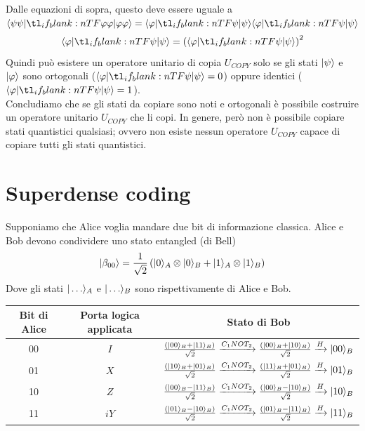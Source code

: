 \documentclass[12pt, a4paper]{report}
\begin{document}
Dalle equazioni di sopra, questo deve essere uguale a $\braket{\psi\psi}{\varphi\varphi} = \braket{\varphi}{\psi}\braket{\varphi}{\psi}$
\begin{equation*}
    \braket{\varphi}{\psi} = \left(\braket{\varphi}{\psi}\right)^{2}
\end{equation*}
Quindi può esistere un operatore unitario di copia $U_{COPY}$ solo se gli stati $| \psi \rangle$ e $| \varphi \rangle$ sono ortogonali ($\braket{\varphi}{\psi} = 0$) oppure identici ($\braket{\varphi}{\psi} = 1$).\\
Concludiamo che se gli stati da copiare sono noti e ortogonali è possibile costruire un operatore unitario $U_{COPY}$ che li copi. In genere, però non è possibile copiare stati quantistici qualsiasi; ovvero non esiste nessun operatore $U_{COPY}$ capace di copiare tutti gli stati quantistici. 
\section{Superdense coding}
Supponiamo che Alice voglia mandare due bit di informazione classica. Alice e Bob devono condividere uno stato entangled (di Bell)
\begin{equation*}
    | \beta_{00} \rangle = \frac{1}{\sqrt{2}}\left(| 0 \rangle_{A}\otimes| 0 \rangle_{B}+| 1 \rangle_{A}\otimes| 1 \rangle_{B}\right)
\end{equation*}
Dove gli stati $| \ldots \rangle_{A}$ e $| \ldots \rangle_{B}$ sono rispettivamente di Alice e Bob.
\begin{center}
    \begin{tabular}{| c | c | c |}
        \hline
        \textbf{Bit di Alice} & \textbf{Porta logica applicata} & \textbf{Stato di Bob} \\
        \hline
        00 & $I$ & $\frac{\left(| 00 \rangle_{B}+| 11 \rangle_{B}\right)}{\sqrt{2}} \xrightarrow{C_{1}NOT_{2}} \frac{\left(| 00 \rangle_{B}+| 10 \rangle_{B}\right)}{\sqrt{2}} \xrightarrow{H} | 00 \rangle_{B}$ \\
        \hline
        01 & $X$ & $\frac{\left(| 10 \rangle_{B}+| 01 \rangle_{B}\right)}{\sqrt{2}} \xrightarrow{C_{1}NOT_{2}} \frac{\left(| 11 \rangle_{B}+| 01 \rangle_{B}\right)}{\sqrt{2}} \xrightarrow{H} | 01 \rangle_{B}$ \\
        \hline
        10 & $Z$ & $\frac{\left(| 00 \rangle_{B}-| 11 \rangle_{B}\right)}{\sqrt{2}} \xrightarrow{C_{1}NOT_{2}} \frac{\left(| 00 \rangle_{B}-| 10 \rangle_{B}\right)}{\sqrt{2}} \xrightarrow{H} | 10 \rangle_{B}$ \\
        \hline
        11 & $iY$ & $\frac{\left(| 01 \rangle_{B}-| 10 \rangle_{B}\right)}{\sqrt{2}} \xrightarrow{C_{1}NOT_{2}} \frac{\left(| 01 \rangle_{B}-| 11 \rangle_{B}\right)}{\sqrt{2}} \xrightarrow{H} | 11 \rangle_{B}$ \\
        \hline
    \end{tabular}
\end{center}
\end{document}
